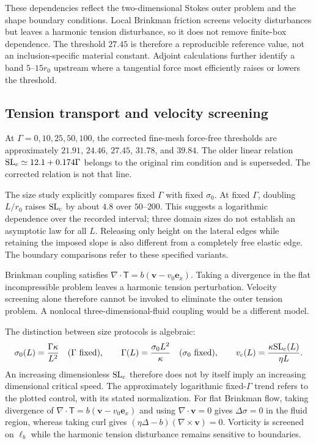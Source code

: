 These dependencies reflect the two-dimensional Stokes outer problem and the shape boundary conditions. Local Brinkman friction screens velocity disturbances but leaves a harmonic tension disturbance, so it does not remove finite-box dependence. The threshold $27.45$ is therefore a reproducible reference value, not an inclusion-specific material constant. Adjoint calculations further identify a band $5$--$15r_0$ upstream where a tangential force most efficiently raises or lowers the threshold.




\subsection{Tension transport and velocity screening}


At $\Gamma=0,10,25,50,100$, the corrected fine-mesh force-free thresholds are approximately $21.91$, $24.46$, $27.45$, $31.78$, and $39.84$. The older linear relation $\mathrm{SL}_c\simeq12.1+0.174\Gamma$ belongs to the original rim condition and is superseded. The corrected relation is not that line.

The size study explicitly compares fixed $\Gamma$ with fixed $\sigma_0$. At fixed $\Gamma$, doubling $L/r_0$ raises $\mathrm{SL}_c$ by about $4.8$ over $50$--$200$. This suggests a logarithmic dependence over the recorded interval; three domain sizes do not establish an asymptotic law for all $L$. Releasing only height on the lateral edges while retaining the imposed slope is also different from a completely free elastic edge. The boundary comparisons refer to these specified variants.

Brinkman coupling satisfies $\nabla\cdot\mathsf T=b(\bm v-v_0\bm e_x)$. Taking a divergence in the flat incompressible problem leaves a harmonic tension perturbation. Velocity screening alone therefore cannot be invoked to eliminate the outer tension problem. A nonlocal three-dimensional-fluid coupling would be a different model.


The distinction between size protocols is algebraic:
\begin{equation}
\sigma_0(L)=\frac{\Gamma\kappa}{L^2}\quad(\Gamma\text{ fixed}),
\qquad \Gamma(L)=\frac{\sigma_0L^2}{\kappa}\quad(\sigma_0\text{ fixed}),
\qquad v_c(L)=\frac{\kappa\mathrm{SL}_c(L)}{\eta L}.
\label{eq:size-protocols}
\end{equation}
An increasing dimensionless $\mathrm{SL}_c$ therefore does not by itself imply an increasing dimensional critical speed. The approximately logarithmic fixed-$\Gamma$ trend refers to the plotted control, with its stated normalization. For flat Brinkman flow, taking divergence of $\nabla\cdot\mathsf T=b(\bm v-v_0\bm e_x)$ and using $\nabla\cdot\bm v=0$ gives $\Delta\sigma=0$ in the fluid region, whereas taking curl gives $(\eta\Delta-b)(\nabla\times\bm v)=0$. Vorticity is screened on $\ell_b$ while the harmonic tension disturbance remains sensitive to boundaries.

